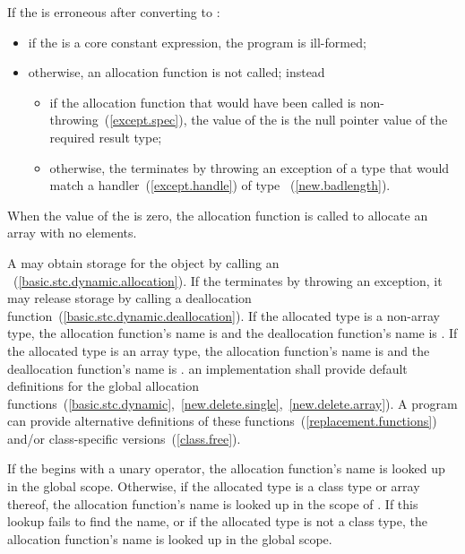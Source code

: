 If the  is erroneous after converting to :
\begin{itemize}
\item
if the  is a core constant expression,
the program is ill-formed;
\item
otherwise, an allocation function is not called; instead
\begin{itemize}
\item
if the allocation function that would have been called is
non-throwing~(\ref{except.spec}), the value of the 
is the null pointer value of the required result type;
\item
otherwise, the  terminates by throwing an
exception of a type that would match a handler~(\ref{except.handle}) of type
~(\ref{new.badlength}).
\end{itemize}
\end{itemize}
When the value of the  is zero, the allocation
function is called to allocate an array with no elements.

\pnum
A  may obtain storage for the object by calling an
~(\ref{basic.stc.dynamic.allocation}). If
the  terminates by throwing an exception, it
may release storage by calling a deallocation
function~(\ref{basic.stc.dynamic.deallocation}). If the allocated type
is a non-array type, the allocation function's name is
%
%
 and the deallocation function's name is
. If the allocated type is an array type, the
allocation function's name is
%
%
and the deallocation function's name is
.
\enternote 
an implementation shall provide default definitions for the global
allocation
functions~(\ref{basic.stc.dynamic},~\ref{new.delete.single},~\ref{new.delete.array}).
A \Cpp program can provide alternative definitions of
these functions~(\ref{replacement.functions}) and/or class-specific
versions~(\ref{class.free}).
\exitnote 

\pnum
{}%
If the  begins with a unary \tcode{::}
operator, the allocation function's name is looked up in the global
scope. Otherwise, if the allocated type is a class type  or
array thereof, the allocation function's name is looked up in the scope
of . If this lookup fails to find the name, or if the allocated
type is not a class type, the allocation function's name is looked up in
the global scope.

